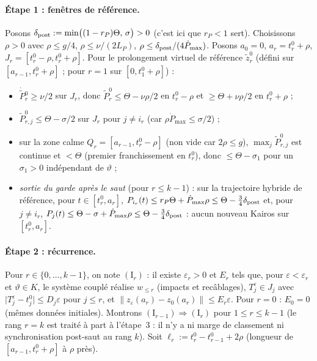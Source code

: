 \documentclass[11pt,a4paper]{article}
\theoremstyle{remark}
\theoremstyle{definition}
\newcommand{\norm}[1]{\lVert #1\rVert}
\newcommand{\eps}{\varepsilon}
\newcommand{\vth}{\vartheta}
\newcommand{\zt}{\widetilde z}
\newcommand{\Pt}{\widetilde P}
\begin{document}
\paragraph{Étape 1 : fenêtres de référence.} Posons $\delta_{\rm post}:=\min\bigl((1-r_P)\Theta,\,\sigma\bigr)>0$ (c'est ici que $r_P<1$ sert). Choisissons $\rho>0$ avec $\rho\le g/4$, $\rho\le\nu/(2L_P)$, $\rho\le\delta_{\rm post}/(4\dot P_{\max})$. Posons $a_0=0$, $a_r=t_r^0+\rho$, $J_r=[t_r^0-\rho,t_r^0+\rho]$. Pour le prolongement virtuel de référence $\zt^0_r$ (défini sur $[a_{r-1},t_r^0+\rho]$ ; pour $r=1$ sur $[0,t_1^0+\rho]$) :
\begin{itemize}[nosep]
\item $\dot{\Pt}{}^0_r\ge\nu/2$ sur $J_r$, donc $\Pt^0_r\le\Theta-\nu\rho/2$ en $t_r^0-\rho$ et $\ge\Theta+\nu\rho/2$ en $t_r^0+\rho$ ;
\item $\Pt^0_{r,j}\le\Theta-\sigma/2$ sur $J_r$ pour $j\ne i_r$ (car $\rho\dot P_{\max}\le\sigma/2$) ;
\item sur la zone calme $Q_r=[a_{r-1},t_r^0-\rho]$ (non vide car $2\rho\le g$), $\max_j\Pt^0_{r,j}$ est continue et $<\Theta$ (premier franchissement en $t_r^0$), donc $\le\Theta-\sigma_1$ pour un $\sigma_1>0$ indépendant de $\vth$ ;
\item \emph{sortie du garde après le saut} (pour $r\le k-1$) : sur la trajectoire hybride de référence, pour $t\in[t_r^0,a_r]$, $P_{i_r}(t)\le r_P\Theta+\dot P_{\max}\rho\le\Theta-\tfrac34\delta_{\rm post}$ et, pour $j\ne i_r$, $P_j(t)\le\Theta-\sigma+\dot P_{\max}\rho\le\Theta-\tfrac34\delta_{\rm post}$ : aucun nouveau Kairos sur $[t_r^0,a_r]$.
\end{itemize}

\paragraph{Étape 2 : récurrence.} Pour $r\in\{0,\dots,k-1\}$, on note $(\mathrm I_r)$ : il existe $\eps_r>0$ et $E_r$ tels que, pour $\eps<\eps_r$ et $\vth\in K$, le système couplé réalise $w_{\le r}$ (impacts et recâblages), $T_j^\eps\in J_j$ avec $\lvert T_j^\eps-t_j^0\rvert\le D_j\eps$ pour $j\le r$, et $\norm{z_\eps(a_r)-z_0(a_r)}\le E_r\eps$. Pour $r=0$ : $E_0=0$ (mêmes données initiales). Montrons $(\mathrm I_{r-1})\Rightarrow(\mathrm I_r)$ pour $1\le r\le k-1$ (le rang $r=k$ est traité à part à l'étape~3 : il n'y a ni marge de classement ni synchronisation post-saut au rang $k$). Soit $\ell_r:=t_r^0-t_{r-1}^0+2\rho$ (longueur de $[a_{r-1},t_r^0+\rho]$ à $\rho$ près).
\end{document}
